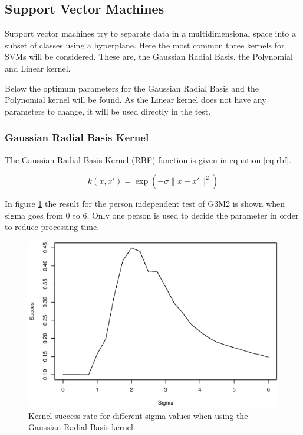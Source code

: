 \subsection{Support Vector Machines}
Support vector machines try to separate data in a multidimensional space into a subset of classes using a hyperplane.
Here the most common three kernels for SVMs will be considered.
These are, the Gaussian Radial Basis, the Polynomial and Linear kernel.

Below the optimum parameters for the Gaussian Radial Basis and the Polynomial kernel will be found.
As the Linear kernel does not have any parameters to change, it will be used directly in the test.

\subsubsection{Gaussian Radial Basis Kernel}
The Gaussian Radial Basis Kernel (RBF) function is given in equation \ref{eq:rbf}.

\begin{equation}
k(x,x') = \exp(-\sigma \|x - x'\|^2)
\label{eq:rbf}
\end{equation}

In figure \ref{fig:rbf} the result for the person independent test of G3M2 is shown when sigma goes from 0 to 6.
Only one person is used to decide the parameter in order to reduce processing time.

\begin{figure}[H]
\centering
\includegraphics[width = 0.9 \textwidth]{graphics/lineplot_svm_rbf}
\caption{Kernel success rate for different sigma values when using the Gaussian Radial Basis kernel.}
\label{fig:rbf}
\end{figure}

